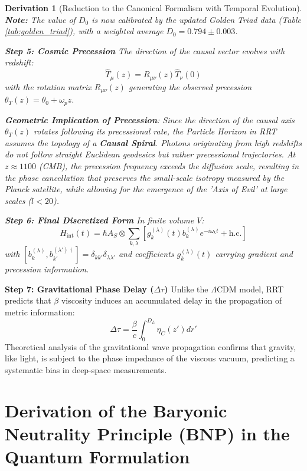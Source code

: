 \documentclass[10pt, a4paper]{article}
\newtheorem{derivation}{Derivation}
\begin{document}
\begin{derivation}[Reduction to the Canonical Formalism with Temporal Evolution]
\textbf{Note:} The value of $D_0$ is now calibrated by the updated Golden Triad data (Table \ref{tab:golden_triad}), with a weighted average $D_0 = 0.794 \pm 0.003$.

\textbf{Step 5: Cosmic Precession}
The direction of the causal vector evolves with redshift:
\begin{equation}
\hat{T}_\mu(z) = R_{\mu\nu}(z) \hat{T}_\nu(0)
\tag{8.8}
\end{equation}
with the rotation matrix $R_{\mu\nu}(z)$ generating the observed precession $\theta_T(z) = \theta_0 + \omega_p z$.

\textbf{Geometric Implication of Precession}: 
Since the direction of the causal axis $\theta_T(z)$ rotates following its precessional rate, the Particle Horizon in RRT assumes the topology of a \textbf{Causal Spiral}. Photons originating from high redshifts do not follow straight Euclidean geodesics but rather precessional trajectories. At $z \approx 1100$ (CMB), the precession frequency exceeds the diffusion scale, resulting in the phase cancellation that preserves the small-scale isotropy measured by the Planck satellite, while allowing for the emergence of the 'Axis of Evil' at large scales ($l < 20$).

\textbf{Step 6: Final Discretized Form}
In finite volume $V$:
\begin{equation}
H_{\text{int}}(t) = \hbar A_S \otimes \sum_{k,\lambda} \left[ g_{k}^{(\lambda)}(t) b_{k}^{(\lambda)} e^{-i\omega_k t} + \text{h.c.} \right]
\tag{8.9}
\end{equation}
with $[b_{k}^{(\lambda)}, b_{k'}^{(\lambda')\dagger}] = \delta_{kk'} \delta_{\lambda\lambda'}$ and coefficients $g_{k}^{(\lambda)}(t)$ carrying gradient and precession information.
\end{derivation}

\textbf{Step 7: Gravitational Phase Delay ($\Delta \tau$)}
Unlike the $\Lambda$CDM model, RRT predicts that $\beta$ viscosity induces an accumulated delay in the propagation of metric information:
\begin{equation}
\Delta \tau = \frac{\beta}{c} \int_0^{D_L} \eta_C(z') dr'
\tag{7.9}
\end{equation}
Theoretical analysis of the gravitational wave propagation confirms that gravity, like light, is subject to the phase impedance of the viscous vacuum, predicting a systematic bias in deep-space measurements.

\section{Derivation of the Baryonic Neutrality Principle (BNP) in the Quantum Formulation}
\end{document}
